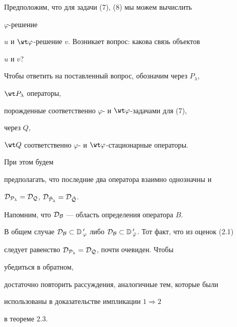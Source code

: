 Предположим, что для задачи (7), (8) мы можем вычислить 


$\varphi$-решение 


$u$ и $\wt\varphi$-решение $v$. Возникает вопрос: какова связь объектов 


$u$ и $v$?  


Чтобы ответить на поставленный вопрос, обозначим через $P_\lambda$, 


$\wt P_\lambda$ операторы, 


порожденные соответственно $\varphi$- и $\wt\varphi$-задачами для (7), 


через $Q$, 


$\wt Q$ соответственно $\varphi$- и $\wt\varphi$-стационарные операторы. 


При этом будем  


предполагать, что последние два оператора взаимно однозначны и 


$\cal D_{P_\lambda}=\cal D_Q$, $\cal D_{\Tilde P_\lambda}=\cal 


D_{\Tilde Q}$. 


Напомним, что $\cal D_B$ --- область определения оператора $B$. 


В общем случае $\cal D_B\subset\Bbb D\,'_\varphi$ либо $\cal 


D_B\subset\Bbb D\,'_{\Tilde\varphi}$. Тот факт, что из оценок (2.1) 


следует равенство $\cal D_{P_\lambda}=\cal D_Q$, почти очевиден. Чтобы 


убедиться в обратном, 


достаточно повторить рассуждения, аналогичные тем, которые были 


использованы в доказательстве импликации $1\Rightarrow 2$ 


в теореме 2.3. 


 


